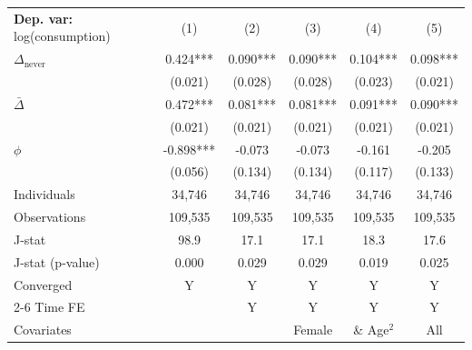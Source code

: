 \begin{tabular}{l ccccc} \toprule  \textbf{Dep. var:}  log(consumption) 
                    &\multicolumn{1}{c}{(1)}   &\multicolumn{1}{c}{(2)}   &\multicolumn{1}{c}{(3)}   &\multicolumn{1}{c}{(4)}   &\multicolumn{1}{c}{(5)}   \\

\addlinespace
$\Delta_{\text{never}}$&       0.424***&       0.090***&       0.090***&       0.104***&       0.098***\\
                    &     (0.021)   &     (0.028)   &     (0.028)   &     (0.023)   &     (0.021)   \\

\addlinespace
$\bar{\Delta}$      &       0.472***&       0.081***&       0.081***&       0.091***&       0.090***\\
                    &     (0.021)   &     (0.021)   &     (0.021)   &     (0.021)   &     (0.021)   \\

\addlinespace
$\phi$              &      -0.898***&      -0.073   &      -0.073   &      -0.161   &      -0.205   \\
                    &     (0.056)   &     (0.134)   &     (0.134)   &     (0.117)   &     (0.133)   \\
\addlinespace
Individuals         &      34,746   &      34,746   &      34,746   &      34,746   &      34,746   \\
Observations        &     109,535   &     109,535   &     109,535   &     109,535   &     109,535   \\
J-stat              &        98.9   &        17.1   &        17.1   &        18.3   &        17.6   \\
J-stat (p-value)    &       0.000   &       0.029   &       0.029   &       0.019   &       0.025   \\
Converged           &           Y   &           Y   &           Y   &           Y   &           Y   \\
\cmidrule{2-6} Time FE & & Y & Y & Y & Y \\ Covariates & & & Female & \& Age$^2$ & All \\ \bottomrule \end{tabular}
